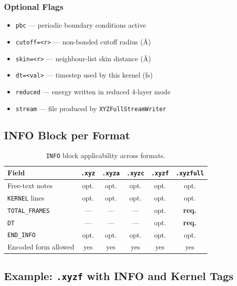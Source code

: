 \documentclass[12pt, a4paper, oneside]{article}
\newcommand{\type}[1]{\texttt{#1}}
\begin{document}
\subsubsection{Optional Flags}

\begin{itemize}
  \item \texttt{pbc} --- periodic boundary conditions active
  \item \texttt{cutoff=<r>} --- non-bonded cutoff radius (\AA)
  \item \texttt{skin=<r>} --- neighbour-list skin distance (\AA)
  \item \texttt{dt=<val>} --- timestep used by this kernel (fs)
  \item \texttt{reduced} --- energy written in reduced 4-layer mode
  \item \texttt{stream} --- file produced by \type{XYZFullStreamWriter}
\end{itemize}

\subsection{INFO Block per Format}

\begin{table}[htbp]
  \centering
  \caption{\texttt{INFO} block applicability across formats.}
  \label{tab:info_formats}
  \begin{tabular}{lccccc}
    \toprule
    Field & \texttt{.xyz} & \texttt{.xyza} & \texttt{.xyzc} & \texttt{.xyzf} & \texttt{.xyzfull} \\
    \midrule
    Free-text notes        & opt. & opt. & opt. & opt. & opt. \\
    \texttt{KERNEL} lines  & opt. & opt. & opt. & opt. & opt. \\
    \texttt{TOTAL\_FRAMES} & ---  & ---  & ---  & opt. & \textbf{req.} \\
    \texttt{DT}            & ---  & ---  & ---  & opt. & \textbf{req.} \\
    \texttt{END\_INFO}     & opt. & opt. & opt. & opt. & opt. \\
    Encoded form allowed   & yes  & yes  & yes  & yes  & yes  \\
    \bottomrule
  \end{tabular}
\end{table}

\subsection{Example: \texttt{.xyzf} with INFO and Kernel Tags}
\end{document}
